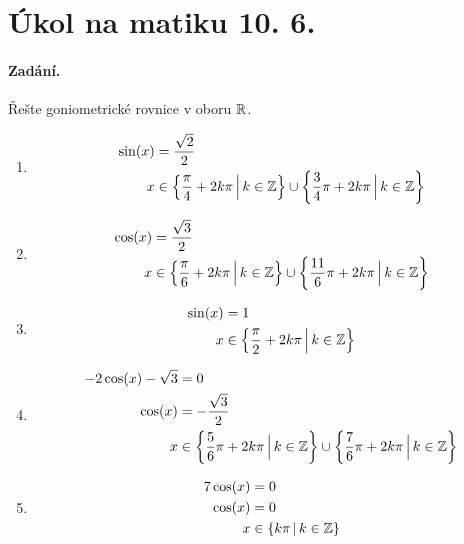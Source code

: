 \documentclass[11pt,a4paper]{article}
\begin{document}
	
	\section*{Úkol na matiku 10. 6.}
		
		\paragraph*{Zadání.} Řešte goniometrické rovnice v oboru ${\mathbb R}$.
			
			\begin{enumerate}
				
				\item
				\begin{align*}
					\sin(x) &= \frac{\sqrt 2}{2}
				\\
					x &\in \left\{ \frac \pi 4 + 2k\pi \, \Big| \, k \in {\mathbb Z} \right\} \cup \left\{ \frac 34 \pi + 2k\pi \, \Big| \, k \in {\mathbb Z} \right\}
				\end{align*}
				
				\item 
				\begin{align*}
					\cos(x) &= \frac{\sqrt 3}{2}
				\\
					x &\in \left\{ \frac \pi 6 + 2k\pi \, \Big| \, k \in {\mathbb Z} \right\} \cup \left\{ \frac{11}6 \pi + 2k\pi \, \Big| \, k \in {\mathbb Z} \right\}
				\end{align*}
				
				\item 
				\begin{align*}
					\sin(x) &= 1
				\\
					x &\in \left\{ \frac \pi 2 + 2k\pi \, \Big| \, k \in {\mathbb Z} \right\}
				\end{align*}
				
				\item 
				\begin{align*}
					-2\cos(x) - \sqrt 3 &= 0
				\\
					\cos(x) &= -\frac{\sqrt 3}{2}
				\\
					x &\in \left\{ \frac 56 \pi + 2k\pi \, \Big| \, k \in {\mathbb Z} \right\} \cup \left\{ \frac 76 \pi + 2k\pi \, \Big| \, k \in {\mathbb Z} \right\}
				\end{align*}
				
				\item 
				\begin{align*}
					7 \cos(x) &= 0
				\\
					\cos(x) &= 0
				\\
					x &\in \left\{ k \pi \, | \, k \in {\mathbb Z} \right\}
				\end{align*}
				

\end{enumerate}
\end{document}
